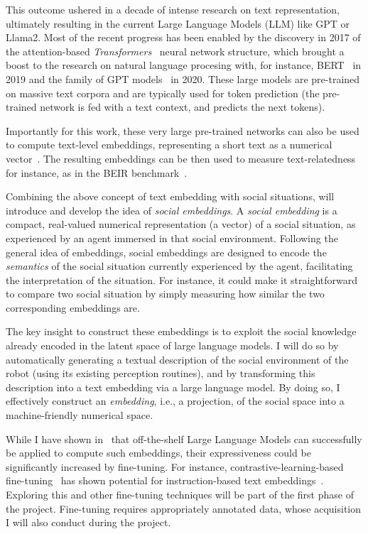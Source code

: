 This outcome ushered in a decade of intense research on text representation,
ultimately resulting in the current Large Language Models (LLM) like GPT or
Llama2. Most of the recent progress has been enabled by the discovery in 2017 of
the attention-based \emph{Transformers}~\cite{vaswani2017attention} neural
network structure, which brought a boost to the research on natural language
procesing with, for instance, BERT~\cite{devlin2019bert} in 2019 and the family
of GPT models~\cite{wolf2020transformers} in 2020. These large models are
pre-trained on massive text corpora and are typically used for token prediction
(the pre-trained network is fed with a text context, and predicts the next
tokens).

Importantly for this work, these very large pre-trained networks can also be used
to compute text-level embeddings, representing a short text as a numerical
vector~\cite{reimers2019sentencebert,muennighoff2022sgpt}. The resulting
embeddings can be then used to measure text-relatedness for instance, as in the BEIR
benchmark~\cite{thakur2021beir}.

Combining the above concept of text embedding with social situations, \project
will introduce and develop the idea of \emph{social embeddings}. A \emph{social
embedding} is a compact, real-valued numerical representation (a vector) of a
social situation, as experienced by an agent immersed in that social
environment. Following the general idea of embeddings, social embeddings are
designed to encode the \emph{semantics} of the social situation currently
experienced by the agent, facilitating the interpretation of the situation. For
instance, it could make it straightforward to compare two social situation by
simply measuring how similar the two corresponding embeddings are.

The key insight to construct these embeddings is to exploit the social knowledge
already encoded in the latent space of large language models. I will do so by
automatically generating a textual description of the social environment of the
robot (using its existing perception routines), and by transforming this
description into a text embedding via a large language model. By doing so, I
effectively construct an \emph{embedding}, i.e., a projection, of the social
space into a machine-friendly numerical space.


While I have shown in~\cite{lemaignan2024social} that off-the-shelf Large
Language Models can successfully be applied to compute such embeddings, their
expressiveness could be significantly increased by fine-tuning. For instance,
contrastive-learning-based fine-tuning~\cite{hadsell2006dimensionality} has
shown potential for instruction-based text embeddings~\cite{canal2022survey}.
Exploring this and other fine-tuning techniques will be part of the first phase
of the project. Fine-tuning requires appropriately annotated data, whose
acquisition I will also conduct during the project.

